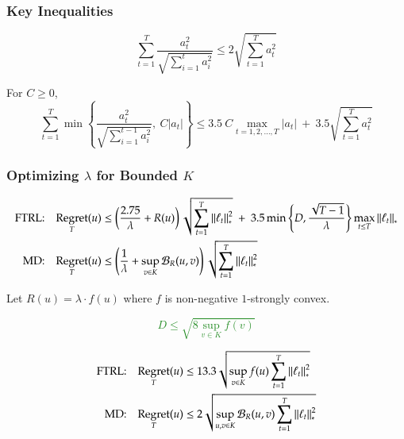 \documentclass[usenames,dvipsnames]{beamer}
\newtheorem*{proposition}{Proposition}
\DeclareMathOperator{\Regret}{Regret}
\newcommand{\norm}[1]{\left\|#1\right\|}
\newcommand{\Breg}{\mathcal{B}}
\begin{document}
\begin{frame}
\frametitle{Key Inequalities}

\begin{lemma}
$$
\sum_{t=1}^T \frac{a_t^2}{\sqrt{\sum_{i=1}^t a_i^2}} \le 2 \sqrt{\sum_{t=1}^T a_t^2}
$$
\end{lemma}

\pause

\begin{lemma}
For $C \ge 0$,
$$
\sum_{t=1}^T \min \left\{ \frac{a_t^2}{\sqrt{\sum_{i=1}^{t-1} a_i^2}}, \ C |a_t| \right\}
\le 3.5 \ C \max_{t=1,2,\dots,T} |a_t| \ + \ 3.5 \sqrt{\sum_{t=1}^T a_t^2}
$$
\end{lemma}


\end{frame}


\begin{frame}
\frametitle{Optimizing $\lambda$ for Bounded $K$}

\fontsize{8.5pt}{10}\selectfont

\begin{align*}
\textsc{FTRL:} & & \Regret_T(u) & \le \left( \frac{2.75}{\lambda} + R(u)\right) \sqrt{\sum_{t=1}^T \norm{\ell_t}_*^2} \ + \ 3.5 \min \left\{ D, \frac{\sqrt{T-1}}{\lambda} \right\} \max_{t \le T} \norm{\ell_t}_* \\
\textsc{MD:} & & \Regret_T(u) & \le \left( \frac{1}{\lambda} + \sup_{v \in K} \Breg_{R}(u,v) \right) \sqrt{\sum_{t=1}^T \norm{\ell_t}_*^2}
\end{align*}

\vspace{0.3cm}

\pause
Let $R(u) = \lambda \cdot f(u)$ where $f$ is non-negative $1$-strongly convex.

\pause

\textcolor{ForestGreen}{
$$
D \le \sqrt{8 \sup_{v \in K} f(v)}
$$
}

\pause

\begin{align*}
\textsc{FTRL:} & & \Regret_T(u) & \le 13.3 \sqrt{\sup_{v \in K} f(u) \sum_{t=1}^T \norm{\ell_t}_*^2} \\
\textsc{MD:} & & \Regret_T(u) & \le 2 \sqrt{\sup_{u, v \in K} \Breg_{R}(u,v) \sum_{t=1}^T \norm{\ell_t}_*^2}
\end{align*}
\end{frame}
\end{document}
